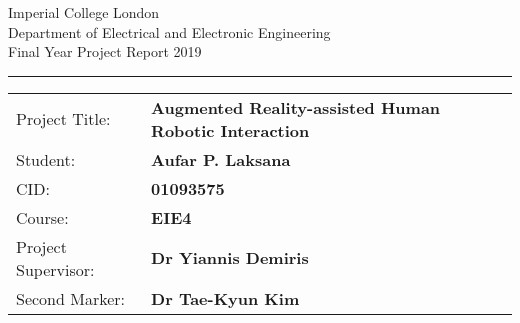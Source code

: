 \begin{titlepage}
	\setlength{\parindent}{0pt}
	\setlength{\parskip}{0pt}
	
	{
		\Large
		\raggedright
		Imperial College London\\[17pt]
		Department of Electrical and Electronic Engineering\\[17pt]
		Final Year Project Report 2019\\[17pt]
		
	}
	
	\rule{\columnwidth}{3pt}
	\vfill
	\centering
	\vfill
	\setlength{\tabcolsep}{0pt}
	
	\begin{tabular}{p{40mm}p{\dimexpr\columnwidth-40mm}}
		Project Title: & \textbf{Augmented Reality-assisted Human Robotic Interaction} \\[12pt]
		Student: & \textbf{Aufar P. Laksana} \\[12pt]
		CID: & \textbf{01093575} \\[12pt]
		Course: & \textbf{EIE4} \\[12pt]
		Project Supervisor: & \textbf{Dr Yiannis Demiris} \\[12pt]
		Second Marker: & \textbf{Dr Tae-Kyun Kim} \\
	\end{tabular}
\end{titlepage}